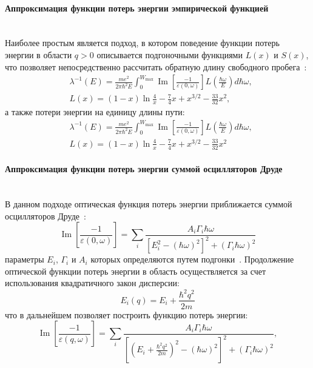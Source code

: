 \paragraph{Аппроксимация функции потерь энергии эмпирической функцией} \mbox{} \\
\indent Наиболее простым является подход, в котором поведение функции потерь энергии в области $q > 0$ описывается подгоночными функциями $L(x)$ и $S(x)$, что позволяет непосредственно рассчитать обратную длину свободного пробега~\cite{Ashley_LxSx}:
\begin{equation}
	\begin{aligned}
		&\lambda^{-1}(E)=\frac{m e^2}{2 \pi \hbar^2 E} \int_0^{W_{\max }} \operatorname{Im}\left[\frac{-1}{\varepsilon(0, \omega)}\right] L\left(\frac{\hbar \omega}{E}\right) d \hbar \omega, \\
		&L(x)=(1-x) \ln \frac{4}{x}-\frac{7}{4} x+x^{3 / 2}-\frac{33}{32} x^2,
	\end{aligned}
\end{equation}
а также потери энергии на единицу длины пути:
\begin{equation}
	\begin{aligned}
		&\lambda^{-1}(E)=\frac{m e^2}{2 \pi \hbar^2 E} \int_0^{W_{\max }} \operatorname{Im}\left[\frac{-1}{\varepsilon(0, \omega)}\right] L\left(\frac{\hbar \omega}{E}\right) d \hbar \omega, \\
		&L(x)=(1-x) \ln \frac{4}{x}-\frac{7}{4} x+x^{3 / 2}-\frac{33}{32} x^2
	\end{aligned}
\end{equation}


\newpage
\paragraph{Аппроксимация функции потерь энергии суммой осцилляторов Друде} \mbox{} \\
\indent В данном подходе оптическая функция потерь энергии приближается суммой осцилляторов Друде~\cite{Ritchie_Drude}:
\begin{equation}
	\operatorname{Im}\left[\frac{-1}{\varepsilon(0, \omega)}\right]=\sum_i \frac{A_i \Gamma_i \hbar \omega}{\left[E_i^2-(\hbar \omega)^2\right]^2+\left(\Gamma_i \hbar \omega\right)^2}
\end{equation}
параметры $E_i$, $\Gamma_i$ и $A_i$ которых определяются путем подгонки~\cite{Dapor_2015_oscillators}. Продолжение оптической функции потерь энергии в область осуществляется за счет использования квадратичного закон дисперсии:
\begin{equation}
	E_i(q)=E_i+\frac{\hbar^2 q^2}{2 m}
\end{equation}
что в дальнейшем позволяет построить функцию потерь энергии:
\begin{equation}
	\operatorname{Im}\left[\frac{-1}{\varepsilon(q, \omega)}\right]=\sum_i \frac{A_i \Gamma_i \hbar \omega}{\left[\left(E_i+\frac{\hbar^2 q^2}{2 m}\right)^2-(\hbar \omega)^2\right]^2+\left(\Gamma_i \hbar \omega\right)^2},
\end{equation}

